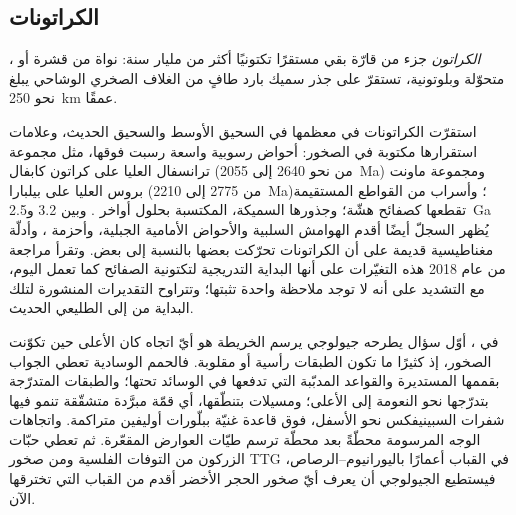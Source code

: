 \subsection*{الكراتونات}

\begin{definition}[الكراتون]\label{def:b2:precambrian-earth:craton}
\emph{الكراتون} جزء من قارّة بقي مستقرًا تكتونيًا
أكثر من مليار سنة: نواة من قشرة  أو ، متحوّلة
وبلوتونية، تستقرّ على جذر سميك بارد طافٍ من الغلاف الصخري الوشاحي يبلغ نحو
\qty{250}{km} عمقًا.
\end{definition}

استقرّت الكراتونات في معظمها في السحيق الأوسط والسحيق الحديث، وعلامات
استقرارها مكتوبة في الصخور: أحواض رسوبية واسعة رسبت فوقها، مثل
مجموعة ترانسفال العليا على كراتون كابفال (من نحو 2640 إلى \qty{2055}{Ma}) ومجموعة ماونت بروس
العليا على بيلبارا (من 2775 إلى \qty{2210}{Ma})؛ وأسراب من القواطع المستقيمة تقطعها
كصفائح هشّة؛ وجذورها السميكة، المكتسبة بحلول أواخر . وبين 3.2
و\qty{2.5}{Ga} يُظهر السجلّ أيضًا أقدم الهوامش السلبية والأحواض الأمامية الجبلية، وأحزمة
، وأدلّة مغناطيسية قديمة على أن الكراتونات تحرّكت بعضها بالنسبة إلى بعض.
وتقرأ مراجعة من عام 2018 هذه التغيّرات على أنها البداية التدريجية لتكتونية الصفائح كما تعمل
اليوم، مع التشديد على أنه لا توجد ملاحظة واحدة تثبتها؛ وتتراوح التقديرات المنشورة لتلك
البداية من  إلى الطليعي الحديث.

\begin{inthefield}
في ، أوّل سؤال يطرحه جيولوجي يرسم الخريطة هو أيّ اتجاه كان الأعلى حين
تكوّنت الصخور، إذ كثيرًا ما تكون الطبقات رأسية أو مقلوبة. فالحمم الوسادية تعطي الجواب
بقممها المستديرة والقواعد المدبّبة التي تدفعها في الوسائد تحتها؛ والطبقات المتدرّجة
بتدرّجها نحو النعومة إلى الأعلى؛ ومسيلات  بتنطّقها، أي قمّة مبرَّدة متشقّقة
تنمو فيها شفرات السبينيفكس نحو الأسفل، فوق قاعدة غنيّة ببلّورات أوليفين متراكمة. واتجاهات
الوجه المرسومة محطّةً بعد محطّة ترسم طيّات العوارض المقعّرة. ثم تعطي حبّات الزركون من التوفات الفلسية
ومن صخور TTG في القباب أعمارًا باليورانيوم--الرصاص، فيستطيع الجيولوجي أن يعرف أيّ صخور
الحجر الأخضر أقدم من القباب التي تخترقها الآن.
\end{inthefield}

